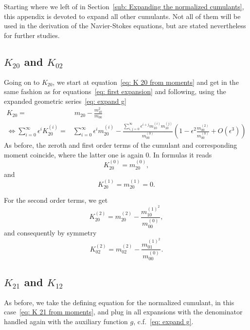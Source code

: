 Starting where we left of in Section~\eqref{sub: Expanding the normalized cumulants}, this appendix is devoted to expand all other cumulants.
Not all of them will be used in the derivation of the Navier-Stokes equations, but are stated nevertheless for further studies.

\subsection{\texorpdfstring{$K_{20}$}{K 20} and \texorpdfstring{$K_{02}$}{K 02}}
\label{sub: K 20}
Going on to $K_{20}$, we start at equation~\eqref{eq: K 20 from moments} and get in the same fashion as for equations~\eqref{eq: first expansion} and following, using the expanded geometric series~\eqref{eq: expand g}
\begin{equation}
  \begin{aligned}
    K_{20}  = &\ m_{20} - \frac{m_{10}^2}{m_{00}}\\
    \Leftrightarrow
    \sum_{i=0}^\infty \epsilon^i K_{20}^{(i)}
    =& \sum_{i=0}^\infty \epsilon^i m_{20}^{(i)}
    - \frac{\sum_{i,j=0}^\infty \epsilon^{i+j} m_{10}^{(i)}m_{10}^{(j)}}
        {m_{00}^{(0)}}
    \left(1 - \epsilon^2 \frac{m_{00}^{(2)}}{m_{00}^{(0)}}  + O(\epsilon^3)\right)
  \end{aligned}
\end{equation}
As before, the zeroth and first order terms of the cumulant and corresponding moment coincide, where the latter one is again $0$. In formulas it reads
\begin{equation}
  K_{20}^{(0)} = m_{20}^{(0)},
\end{equation}
and
\begin{equation}
  K_{20}^{(1)} = m_{20}^{(1)} = 0.
\end{equation}

For the second order terms, we get
\begin{equation}
  K_{20}^{(2)} = m_{20}^{(2)} - \frac{ m_{10}^{{(1)}^2}}{m_{00}^{(0)}},
\end{equation}
and consequently by symmetry
\begin{equation}
  K_{02}^{(2)} = m_{02}^{(2)} - \frac{ m_{01}^{{(1)}^2}}{m_{00}^{(0)}}.
\end{equation}

\subsection{\texorpdfstring{$K_{21}$}{K 21} and \texorpdfstring{$K_{12}$}{K 12}}
\label{sub: K 21}
As before, we take the defining equation for the normalized cumulant, in this case~\eqref{eq: K 21 from moments}, and plug in all expansions with the denominator handled again with the auxiliary function $g$, c.f.~\eqref{eq: expand g}.


